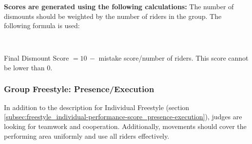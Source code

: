\textbf{Scores are generated using the following calculations:}
The number of dismounts should be weighted by the number of riders in the group.
The following formula is used:

 \\

Final Dismount Score $= 10 \, -$ mistake score/number of riders.
This score cannot be lower than 0.

\subsubsection{Group Freestyle: Presence/Execution}
In addition to the description for Individual Freestyle (section \ref{subsec:freestyle_individual-performance-score_presence-execution}), judges are looking for teamwork and cooperation.
Additionally, movements should cover the performing area uniformly and use all riders effectively.
